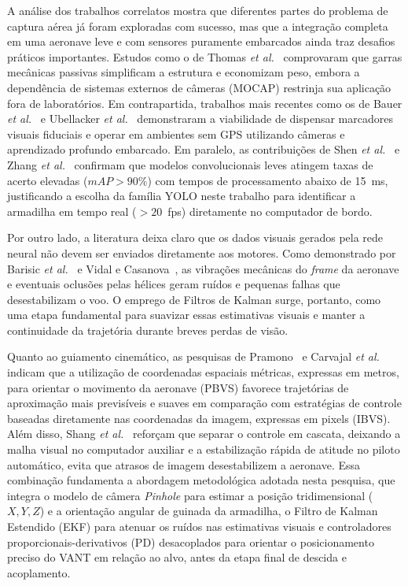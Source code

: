 A análise dos trabalhos correlatos mostra que diferentes partes do problema de captura aérea já foram exploradas com sucesso, mas que a integração completa em uma aeronave leve e com sensores puramente embarcados ainda traz desafios práticos importantes. Estudos como o de Thomas \textit{et al.}~\cite{thomas2014} comprovaram que garras mecânicas passivas simplificam a estrutura e economizam peso, embora a dependência de sistemas externos de câmeras (MOCAP) restrinja sua aplicação fora de laboratórios. Em contrapartida, trabalhos mais recentes como os de Bauer \textit{et al.}~\cite{bauer2023} e Ubellacker \textit{et al.}~\cite{ubellacker2024} demonstraram a viabilidade de dispensar marcadores visuais fiduciais e operar em ambientes sem GPS utilizando câmeras e aprendizado profundo embarcado. Em paralelo, as contribuições de Shen \textit{et al.}~\cite{shen2023} e Zhang \textit{et al.}~\cite{remotesensing2024} confirmam que modelos convolucionais leves atingem taxas de acerto elevadas ($mAP > 90\%$) com tempos de processamento abaixo de 15~ms, justificando a escolha da família YOLO neste trabalho para identificar a armadilha em tempo real ($> 20$~fps) diretamente no computador de bordo.

Por outro lado, a literatura deixa claro que os dados visuais gerados pela rede neural não devem ser enviados diretamente aos motores. Como demonstrado por Barisic \textit{et al.}~\cite{barisic2019} e Vidal e Casanova~\cite{vidal2007}, as vibrações mecânicas do \textit{frame} da aeronave e eventuais oclusões pelas hélices geram ruídos e pequenas falhas que desestabilizam o voo. O emprego de Filtros de Kalman surge, portanto, como uma etapa fundamental para suavizar essas estimativas visuais e manter a continuidade da trajetória durante breves perdas de visão.

Quanto ao guiamento cinemático, as pesquisas de Pramono~\cite{pramono2025} e Carvajal \textit{et al.}~\cite{carvajal2024} indicam que a utilização de coordenadas espaciais métricas, expressas em metros, para orientar o movimento da aeronave (PBVS) favorece trajetórias de aproximação mais previsíveis e suaves em comparação com estratégias de controle baseadas diretamente nas coordenadas da imagem, expressas em pixels (IBVS). Além disso, Shang \textit{et al.}~\cite{shang2016} reforçam que separar o controle em cascata, deixando a malha visual no computador auxiliar e a estabilização rápida de atitude no piloto automático, evita que atrasos de imagem desestabilizem a aeronave. Essa combinação fundamenta a abordagem metodológica adotada nesta pesquisa, que integra o modelo de câmera \textit{Pinhole} para estimar a posição tridimensional ($X, Y, Z$) e a orientação angular de guinada da armadilha, o Filtro de Kalman Estendido (EKF) para atenuar os ruídos nas estimativas visuais e controladores proporcionais-derivativos (PD) desacoplados para orientar o posicionamento preciso do VANT em relação ao alvo, antes da etapa final de descida e acoplamento.
